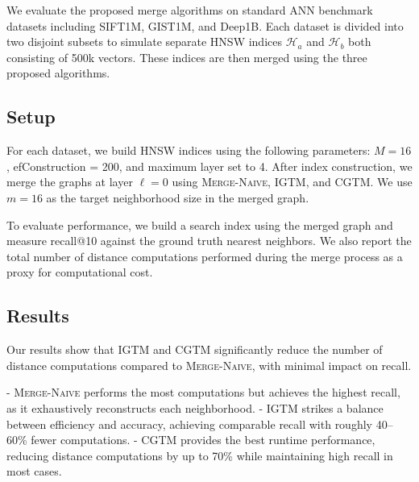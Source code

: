 \documentclass{article}
\begin{document}
We evaluate the proposed merge algorithms on standard ANN benchmark datasets including SIFT1M, GIST1M, and Deep1B.
Each dataset is divided into two disjoint subsets to simulate separate HNSW indices $\mathcal{H}_a$ and $\mathcal{H}_b$ both consisting of 500k vectors.
These indices are then merged using the three proposed algorithms.

\subsection{Setup}

For each dataset, we build HNSW indices using the following parameters: $M = 16$, efConstruction = 200, and maximum layer set to 4.
After index construction, we merge the graphs at layer $\ell = 0$ using \textsc{Merge-Naive}, \textsc{IGTM}, and \textsc{CGTM}. We use $m = 16$ as the target neighborhood size in the merged graph.

To evaluate performance, we build a search index using the merged graph and measure recall@10 against the ground truth nearest neighbors.
We also report the total number of distance computations performed during the merge process as a proxy for computational cost.

\subsection{Results}

Our results show that \textsc{IGTM} and \textsc{CGTM} significantly reduce the number of distance computations compared to \textsc{Merge-Naive}, with minimal impact on recall.

- \textsc{Merge-Naive} performs the most computations but achieves the highest recall, as it exhaustively reconstructs each neighborhood.
- \textsc{IGTM} strikes a balance between efficiency and accuracy, achieving comparable recall with roughly 40–60\% fewer computations.
- \textsc{CGTM} provides the best runtime performance, reducing distance computations by up to 70\% while maintaining high recall in most cases.
\end{document}
